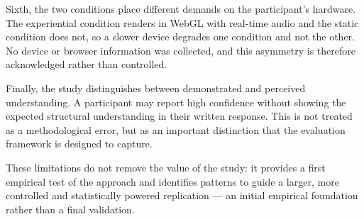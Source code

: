 Sixth, the two conditions place different demands on the participant's hardware. The experiential condition renders in WebGL with real-time audio and the static condition does not, so a slower device degrades one condition and not the other. No device or browser information was collected, and this asymmetry is therefore acknowledged rather than controlled.

Finally, the study distinguishes between demonstrated and perceived understanding. A participant may report high confidence without showing the expected structural understanding in their written response. This is not treated as a methodological error, but as an important distinction that the evaluation framework is designed to capture.

These limitations do not remove the value of the study: it provides a first empirical test of the approach and identifies patterns to guide a larger, more controlled and statistically powered replication --- an initial empirical foundation rather than a final validation.